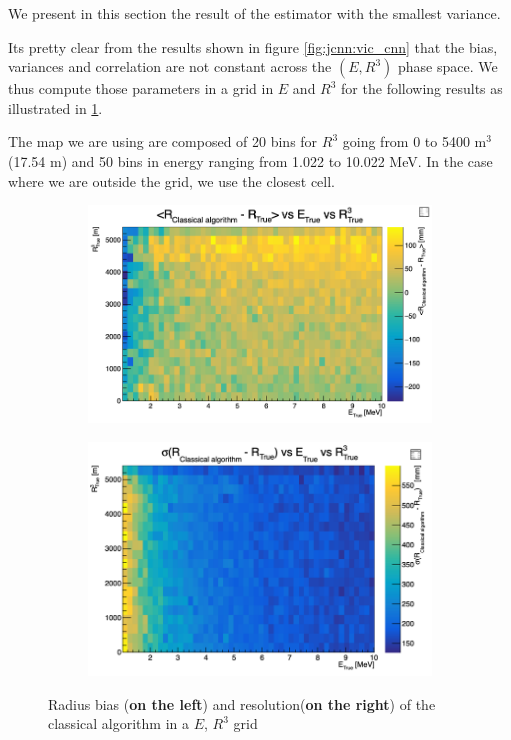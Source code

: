 \documentclass[../main.tex]{subfiles}
\begin{document}
We present in this section the result of the estimator with the smallest variance.

Its pretty clear from the results shown in figure \ref{fig:jcnn:vic_cnn} that the bias, variances and correlation are not constant across the $(E, R^3)$ phase space. We thus compute those parameters in a grid in $E$ and $R^3$ for the following results as illustrated in \ref{fig:jcnn:vic_cnn:res_map}.

The map we are using are composed of 20 bins for $R^3$ going from 0 to 5400 m$^3$ (17.54 m) and 50 bins in energy ranging from 1.022 to 10.022 MeV. In the case where we are outside the grid, we use the closest cell.

\begin{figure}
  \centering
  \begin{subfigure}[t]{0.48\linewidth}
    \includegraphics[width=\linewidth]{images/jcnn/vic_cnn/vic_r_bias.png}
  \end{subfigure}
  \hfill
  \begin{subfigure}[t]{0.48\linewidth}
    \includegraphics[width=\linewidth]{images/jcnn/vic_cnn/vic_r_res.png}
  \end{subfigure}
  \caption{Radius bias (\textbf{on the left}) and resolution(\textbf{on the right}) of the classical algorithm in a $E$, $R^3$ grid}
  \label{fig:jcnn:vic_cnn:res_map}
\end{figure}
\end{document}

